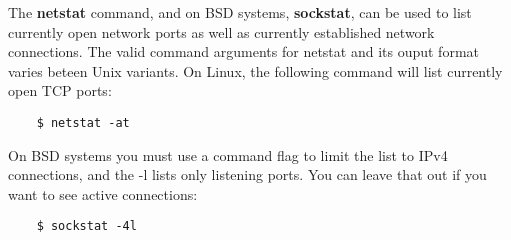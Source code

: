 The \textbf{netstat} command, and on BSD systems, \textbf{sockstat}, can be used to list currently open network ports as well as currently established network connections.  The valid command arguments for netstat and its ouput format varies beteen Unix variants. On Linux, the following command will list currently open TCP ports:

\begin{verbatim}
    $ netstat -at 
\end{verbatim}

On BSD systems you must use a command flag to limit the list to IPv4 connections, and the -l lists only listening ports.  You can leave that out if you want to see active connections:

\begin{verbatim}
    $ sockstat -4l
\end{verbatim}